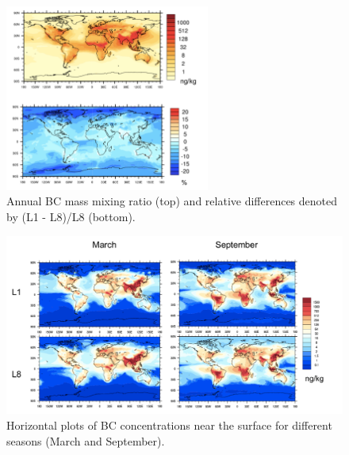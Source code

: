\documentclass[12pt, fullpage]{uiucthesis2009}
\begin{document}
	\begin{figure}[h] 
		\begin{center}
			\includegraphics[width = 0.6\textwidth]{Figure13}
			\caption[Annual BC mass mixing ratio (top) and relative differences denoted by (L1 - L8)/L8 (bottom)]{\label{fig_P13} Annual BC mass mixing ratio (top) and relative differences denoted by (L1 - L8)/L8 (bottom).}
		\end{center}
	\end{figure}
	
	\begin{figure}[h] 
			\begin{center}
				\includegraphics[width = 1\textwidth]{Figure21}
				\caption[Horizontal plots of BC concentrations near the surface for different seasons (March and September)]{\label{fig_P21} Horizontal plots of BC concentrations near the surface for different seasons (March and September).}
			\end{center}
		\end{figure}
	
\end{document}
